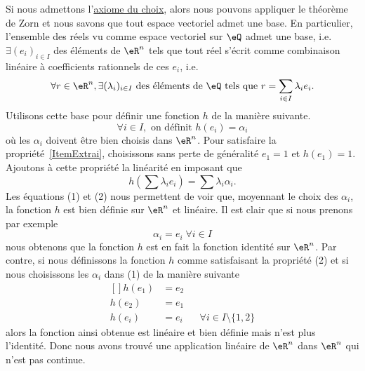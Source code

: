 Si nous admettons l'\href{http://fr.wikipedia.org/wiki/Axiome_du_choix}{axiome du choix}, alors nous pouvons appliquer le théorème de Zorn
et nous savons que tout espace vectoriel admet une base. En particulier, l'ensemble des réels vu comme espace vectoriel sur $\eQ$ admet une base, i.e. $\exists (e_i)_{i\in I}$  des éléments de $\eR^n$ tels que tout réel s'écrit comme combinaison linéaire à coefficients rationnels  de ces $e_i$, i.e.
\begin{equation}
	\forall r \in \eR^n, \exists (\lambda_i)_{i\in I} \text{ des éléments de } \eQ \text{ tels que  } r = \sum_{i\in I} \lambda_i e_i.
\end{equation}
Utilisons cette base pour définir une fonction $h$ de la manière suivante.
\begin{equation}
\forall i \in I, \mbox{ on définit } h(e_i) = \alpha_i
\end{equation}
 où les $\alpha_i$ doivent être bien choisis dans $\eR^n$. Pour satisfaire la propriété~\ref{ItemExtrai}, choisissons sans perte de généralité $e_1 = 1$ et $h(e_1) = 1$.  Ajoutons à cette propriété la linéarité en imposant que
\begin{equation}
h(\sum \lambda_i e_i) = \sum \lambda_i \alpha_i.
\end{equation}
Les équations (1) et (2) nous permettent de voir que, moyennant le choix des $\alpha_i$, la fonction $h$ est bien définie sur $\eR^n$ et linéaire. Il est clair que si nous prenons par exemple
$$\alpha_i=e_i\;\forall i \in I$$
nous obtenons que la fonction $h$ est en fait la fonction identité sur $\eR^n$. Par contre, si nous définissons la fonction $h$ comme satisfaisant la propriété (2) et si nous choisissons les $\alpha_i$ dans (1) de la manière suivante
\begin{equation}
	\begin{aligned}[]
		h(e_1)	&= e_2\\
		h(e_2)	&= e_1\\
		h(e_i)	&= e_i	&&\forall i\in I\setminus\{ 1,2 \}
	\end{aligned}
\end{equation}
alors la fonction ainsi obtenue est linéaire et bien définie mais n'est plus l'identité. Donc nous avons trouvé une application linéaire de $\eR^n$ dans $\eR^n$ qui n'est pas continue.

